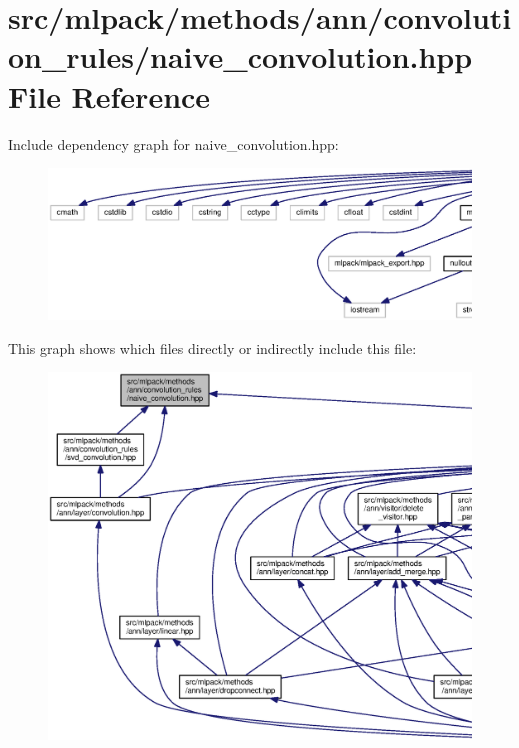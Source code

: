 \section{src/mlpack/methods/ann/convolution\+\_\+rules/naive\+\_\+convolution.hpp File Reference}
\label{naive__convolution_8hpp}
Include dependency graph for naive\+\_\+convolution.\+hpp\+:
\nopagebreak
\begin{figure}[H]
\begin{center}
\leavevmode
\includegraphics[width=350pt]{naive__convolution_8hpp__incl}
\end{center}
\end{figure}
This graph shows which files directly or indirectly include this file\+:
\nopagebreak
\begin{figure}[H]
\begin{center}
\leavevmode
\includegraphics[width=350pt]{naive__convolution_8hpp__dep__incl}
\end{center}
\end{figure}
